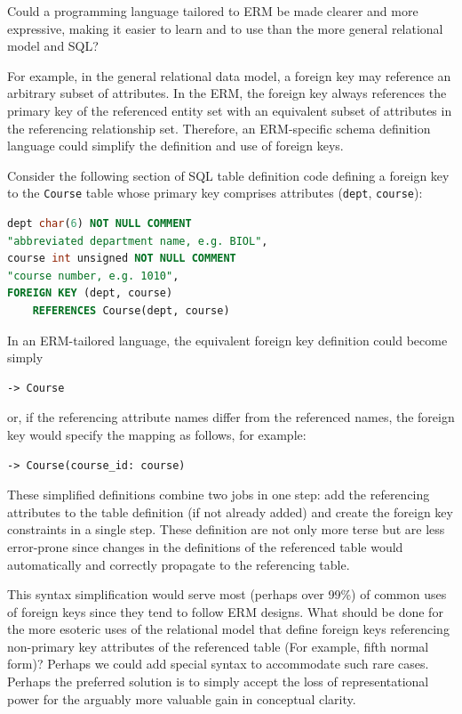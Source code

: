 \documentclass[letter,10pt]{article}
\begin{document}
Could a programming language tailored to ERM be made clearer and more expressive, making it easier to learn and to use than the more general relational model and SQL? 

For example, in the general relational data model, a foreign key may reference an arbitrary subset of attributes. In the ERM, the foreign key always references the primary key of the referenced entity set with an equivalent subset of attributes in the referencing relationship set.  Therefore, an ERM-specific schema definition language could simplify the definition and use of foreign keys.

Consider the following section of SQL table definition code defining a foreign key to the {\tt Course} table whose primary key comprises attributes ({\tt dept}, {\tt course}):
\begin{lstlisting}[language=SQL,frame=none]
dept char(6) NOT NULL COMMENT 
"abbreviated department name, e.g. BIOL",
course int unsigned NOT NULL COMMENT 
"course number, e.g. 1010",
FOREIGN KEY (dept, course) 
    REFERENCES Course(dept, course)
\end{lstlisting}
In an ERM-tailored language, the equivalent foreign key definition could become simply
\begin{lstlisting}[language=dj,frame=none]
-> Course
\end{lstlisting}
or, if the referencing attribute names differ from the referenced names, the foreign key would specify the mapping as follows, for example:
\begin{lstlisting}[language=dj,frame=none]
-> Course(course_id: course)
\end{lstlisting}

These simplified definitions combine two jobs in one step:  add the referencing attributes to the table definition (if not already added) and create the foreign key constraints in a single step.  These definition are not only more terse but are less error-prone since changes in the definitions of the referenced table would automatically and correctly propagate to the referencing table. 

This syntax simplification would serve most (perhaps over 99\%) of common uses of foreign keys since they tend to follow ERM designs. What should be done for the more esoteric uses of the relational model that define foreign keys referencing non-primary key attributes of the referenced table (For example, fifth normal form)?  Perhaps we could add special syntax to accommodate such rare cases. Perhaps the preferred solution is to simply accept the loss of representational power for the arguably more valuable gain in conceptual clarity. 
\end{document}
